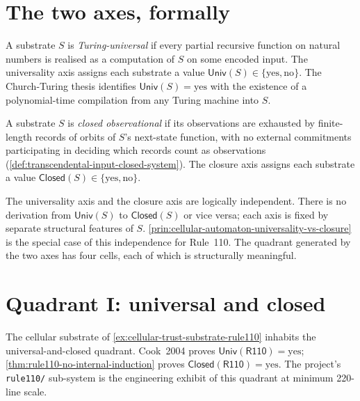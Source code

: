 \section{The two axes, formally}
\label{sec:quadrant-axes}

\begin{definition}
\label{def:quadrant-universality-axis}
A substrate $S$ is \emph{Turing-universal} if every partial recursive function on natural numbers is realised as a computation of $S$ on some encoded input. The universality axis assigns each substrate a value $\mathsf{Univ}(S) \in \{\text{yes}, \text{no}\}$. The Church-Turing thesis identifies $\mathsf{Univ}(S) = \text{yes}$ with the existence of a polynomial-time compilation from any Turing machine into $S$.
\end{definition}

\begin{definition}
\label{def:quadrant-closure-axis}
A substrate $S$ is \emph{closed observational} if its observations are exhausted by finite-length records of orbits of $S$'s next-state function, with no external commitments participating in deciding which records count as observations (\autoref{def:transcendental-input-closed-system}). The closure axis assigns each substrate a value $\mathsf{Closed}(S) \in \{\text{yes}, \text{no}\}$.
\end{definition}

\begin{principle}
\label{prin:quadrant-axes-independent}
The universality axis and the closure axis are logically independent. There is no derivation from $\mathsf{Univ}(S)$ to $\mathsf{Closed}(S)$ or vice versa; each axis is fixed by separate structural features of $S$. \autoref{prin:cellular-automaton-universality-vs-closure} is the special case of this independence for Rule~110. The quadrant generated by the two axes has four cells, each of which is structurally meaningful.
\end{principle}

\section{Quadrant I: universal and closed}
\label{sec:quadrant-universal-closed}

\begin{example}
\label{ex:quadrant-rule110-as-uc}
The cellular substrate of \autoref{ex:cellular-trust-substrate-rule110} inhabits the universal-and-closed quadrant. Cook~2004 proves $\mathsf{Univ}(\mathsf{R110}) = \text{yes}$; \autoref{thm:rule110-no-internal-induction} proves $\mathsf{Closed}(\mathsf{R110}) = \text{yes}$. The project's \texttt{rule110/} sub-system is the engineering exhibit of this quadrant at minimum 220-line scale.
\end{example}

